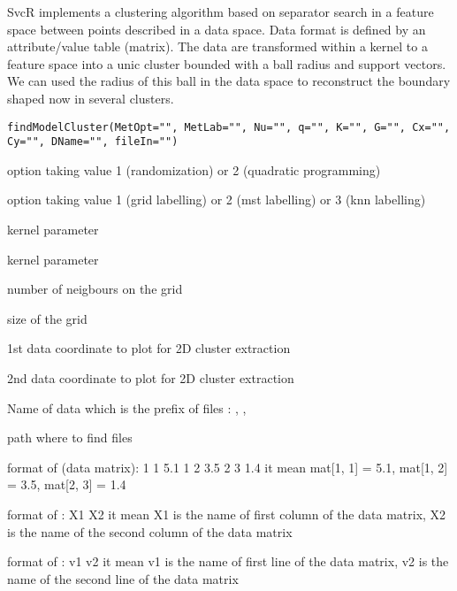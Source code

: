 \documentclass{article}
\begin{document}
\begin{Description}\relax
SvcR implements a clustering algorithm based on separator search in a feature 
space between points described in a data space. Data format is defined by 
an attribute/value table (matrix). The data are transformed within a kernel 
to a feature space into a unic cluster bounded with a ball radius and support vectors. 
We can used the radius of this ball in the data space 
to reconstruct the boundary shaped now in several clusters.
\end{Description}
\begin{Usage}
\begin{verbatim}
findModelCluster(MetOpt="", MetLab="", Nu="", q="", K="", G="", Cx="", Cy="", DName="", fileIn="")
\end{verbatim}
\end{Usage}
\begin{Arguments}
\begin{ldescription}
\item[\code{MetOpt}] option taking value 1 (randomization) or 2 (quadratic programming) 
\item[\code{MetLab}] option taking value 1 (grid labelling) or 2 (mst labelling) or 3 (knn labelling) 
\item[\code{Nu}] kernel parameter  
\item[\code{q}] kernel parameter 
\item[\code{K}] number of neigbours on the grid 
\item[\code{G}] size of the grid 
\item[\code{Cx}] 1st data coordinate to plot for 2D cluster extraction 
\item[\code{Cy}] 2nd data coordinate to plot for 2D cluster extraction 
\item[\code{DName}] Name of data which is the prefix of files :
, 
, 
\item[\code{fileIn}] path where to find files 
\end{ldescription}
\end{Arguments}
\begin{Details}\relax
format of  (data matrix): 
1 1 5.1       
1 2 3.5
2 3 1.4
it mean mat[1, 1] = 5.1, mat[1, 2] = 3.5, mat[2, 3] = 1.4

format of  : 
X1
X2
it mean X1 is the name of first column of the data matrix, X2 is the name of the second column of the data matrix

format of  : 
v1
v2
it mean v1 is the name of first line of the data matrix, v2 is the name of the second line of the data matrix
\end{Details}
\end{document}
